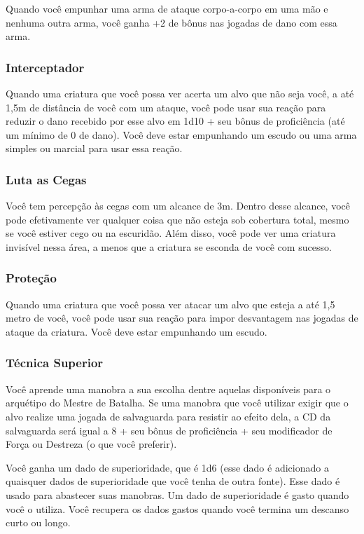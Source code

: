 \begin{multicols}{2}
Quando você empunhar uma arma de ataque corpo-a-corpo em uma mão e nenhuma outra
arma, você ganha +2 de bônus nas jogadas de dano com essa arma.

\subsubsection{Interceptador}%

Quando uma criatura que você possa ver acerta um alvo que não seja você, a até
1,5m de distância de você com um ataque, você pode usar sua reação para reduzir
o dano recebido por esse alvo em 1d10 + seu bônus de proficiência (até um mínimo
de 0 de dano). Você deve estar empunhando um escudo ou uma arma simples ou
marcial para usar essa reação.

\subsubsection{Luta as Cegas}%

Você tem percepção às cegas com um alcance de 3m. Dentro desse alcance, você
pode efetivamente ver qualquer coisa que não esteja sob cobertura total, mesmo
se você estiver cego ou na escuridão. Além disso, você pode ver uma criatura
invisível nessa área, a menos que a criatura se esconda de você com sucesso.

\subsubsection{Proteção}%

Quando uma criatura que você possa ver atacar um alvo que esteja a até 1,5 metro
de você, você pode usar sua reação para impor desvantagem nas jogadas de ataque
da criatura. Você deve estar empunhando um escudo.

\subsubsection{Técnica Superior}%

Você aprende uma manobra a sua escolha dentre aquelas disponíveis para o
arquétipo do Mestre de Batalha. Se uma manobra que você utilizar exigir que o
alvo realize uma jogada de salvaguarda para resistir ao efeito dela, a CD da
salvaguarda será igual a 8 + seu bônus de proficiência + seu modificador de
Força ou Destreza (o que você preferir).

Você ganha um dado de superioridade, que é 1d6 (esse dado é adicionado a
quaisquer dados de superioridade que você tenha de outra fonte). Esse dado é
usado para abastecer suas manobras. Um dado de superioridade é gasto quando você
o utiliza. Você recupera os dados gastos quando você termina um descanso curto
ou longo.


\end{multicols}
